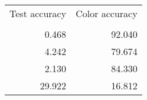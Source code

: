 \begin{tabular}{rr}
\toprule
 Test accuracy &  Color accuracy \\
               &                 \\
\midrule
         0.468 &          92.040 \\
         4.242 &          79.674 \\
         2.130 &          84.330 \\
        29.922 &          16.812 \\
\bottomrule
\end{tabular}

